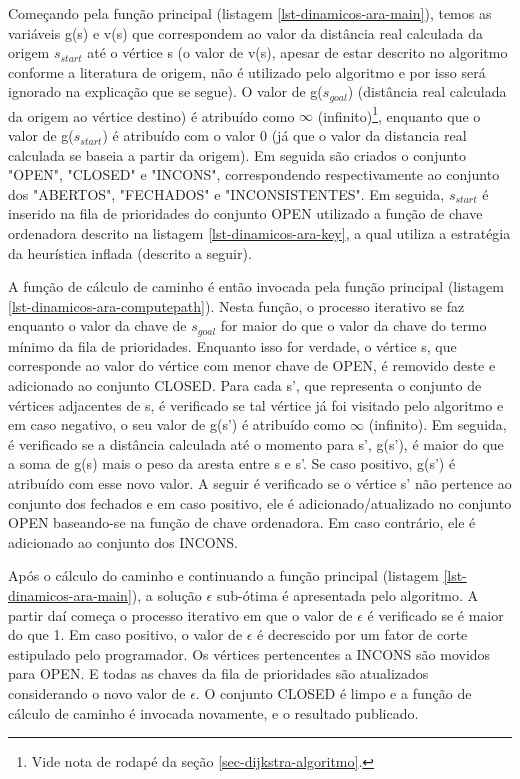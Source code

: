 Começando pela função principal (listagem \ref{lst-dinamicos-ara-main}), temos as variáveis g(s) e v(s) que correspondem ao valor da distância real calculada da origem $s_{start}$ até o vértice s (o valor de v(s), apesar de estar descrito no algoritmo conforme a literatura de origem, não é utilizado pelo algoritmo e por isso será ignorado na explicação que se segue). O valor de g($s_{goal}$) (distância real calculada da origem ao vértice destino) é atribuído como $\infty$ (infinito)\footnote{Vide nota de rodapé da seção \ref{sec-dijkstra-algoritmo}.}, enquanto que o valor de g($s_{start}$) é atribuído com o valor 0 (já que o valor da distancia real calculada se baseia a partir da origem). Em seguida são criados o conjunto "OPEN", "CLOSED" e "INCONS", correspondendo respectivamente ao conjunto dos "ABERTOS", "FECHADOS" e "INCONSISTENTES". Em seguida, $s_{start}$ é inserido na fila de prioridades do conjunto OPEN utilizado a função de chave ordenadora descrito na listagem \ref{lst-dinamicos-ara-key}, a qual utiliza a estratégia da heurística inflada (descrito a seguir).

A função de cálculo de caminho é então invocada pela função principal (listagem \ref{lst-dinamicos-ara-computepath}). Nesta função, o processo iterativo se faz enquanto o valor da chave de $s_{goal}$ for maior do que o valor da chave do termo mínimo da fila de prioridades. Enquanto isso for verdade, o vértice s, que corresponde ao valor do vértice com menor chave de OPEN, é removido deste e adicionado ao conjunto CLOSED. Para cada s', que representa o conjunto de vértices adjacentes de s, é verificado se tal vértice já foi visitado pelo algoritmo e em caso negativo, o seu valor de g(s') é atribuído como $\infty$ (infinito). Em seguida, é verificado se a distância calculada até o momento para s', g(s'), é maior do que a soma de g(s) mais o peso da aresta entre s e s'. Se caso positivo, g(s') é atribuído com esse novo valor. A seguir é verificado se o vértice s' não pertence ao conjunto dos fechados e em caso positivo, ele é adicionado/atualizado no conjunto OPEN baseando-se na função de chave ordenadora. Em caso contrário, ele é adicionado ao conjunto dos INCONS.

Após o cálculo do caminho e continuando a função principal (listagem \ref{lst-dinamicos-ara-main}), a solução $\epsilon$ sub-ótima é apresentada pelo algoritmo. A partir daí começa o processo iterativo em que o valor de $\epsilon$ é verificado se é maior do que 1. Em caso positivo, o valor de $\epsilon$ é decrescido por um fator de corte estipulado pelo programador. Os vértices pertencentes a INCONS são movidos para OPEN. E todas as chaves da fila de prioridades são atualizados considerando o novo valor de $\epsilon$. O conjunto CLOSED é limpo e a função de cálculo de caminho é invocada novamente, e  o resultado publicado.

